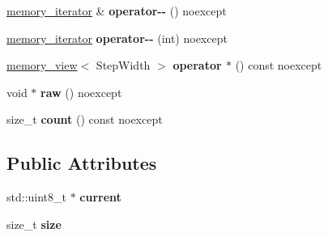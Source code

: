 \begin{DoxyCompactItemize}
\mbox{\hyperlink{structouchi_1_1crypto_1_1memory__iterator}{memory\+\_\+iterator}} \& {\bfseries operator-\/-\/} () noexcept
\item 
\mbox{\label{structouchi_1_1crypto_1_1memory__iterator_a03afee788eb55998e4264fd42eaa4c1c}} 
\mbox{\hyperlink{structouchi_1_1crypto_1_1memory__iterator}{memory\+\_\+iterator}} {\bfseries operator-\/-\/} (int) noexcept
\item 
\mbox{\label{structouchi_1_1crypto_1_1memory__iterator_aafa9f602203c2804a56db818edef7dd5}} 
\mbox{\hyperlink{classouchi_1_1crypto_1_1memory__view}{memory\+\_\+view}}$<$ Step\+Width $>$ {\bfseries operator $\ast$} () const noexcept
\item 
\mbox{\label{structouchi_1_1crypto_1_1memory__iterator_a05a5afb70d23bad01c139d6444592276}} 
void $\ast$ {\bfseries raw} () noexcept
\item 
\mbox{\label{structouchi_1_1crypto_1_1memory__iterator_afc77e9dd7f3fcb6dbf4ead2fa059f0fc}} 
size\+\_\+t {\bfseries count} () const noexcept
\end{DoxyCompactItemize}
\subsection*{Public Attributes}
\begin{DoxyCompactItemize}
\item 
\mbox{\label{structouchi_1_1crypto_1_1memory__iterator_a964bfb2848ac8ea1cc87cd63ebab9388}} 
std\+::uint8\+\_\+t $\ast$ {\bfseries current}
\item 
\mbox{\label{structouchi_1_1crypto_1_1memory__iterator_a7a6fb05b5fb34f0b2baf8df73b932be1}} 
size\+\_\+t {\bfseries size}
\end{DoxyCompactItemize}
